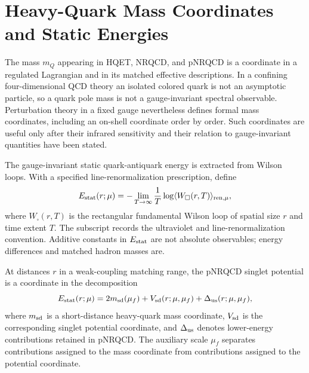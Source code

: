 \section{Heavy-Quark Mass Coordinates and Static Energies}
\label{sec:qcd-heavy-mass-static-energy}

The mass \(m_Q\) appearing in HQET, NRQCD, and pNRQCD is a coordinate in a
regulated Lagrangian and in its matched effective descriptions.  In a confining
four-dimensional QCD theory an isolated colored quark is not an asymptotic
particle, so a quark pole mass is not a gauge-invariant spectral observable.
Perturbation theory in a fixed gauge nevertheless defines formal mass
coordinates, including an on-shell coordinate order by order.  Such
coordinates are useful only after their infrared sensitivity and their
relation to gauge-invariant quantities have been stated.

The gauge-invariant static quark-antiquark energy is extracted from Wilson
loops.  With a specified line-renormalization prescription, define
\begin{equation}
  E_{\rm stat}(r;\mu)
  =
  -\lim_{T\to\infty}\frac1T
  \log \langle W_{\square}(r,T)\rangle_{\rm ren,\mu},
  \label{eq:qcd-static-energy-renormalized}
\end{equation}
where \(W_{\square}(r,T)\) is the rectangular fundamental Wilson loop of
spatial size \(r\) and time extent \(T\).  The subscript records the
ultraviolet and line-renormalization convention.  Additive constants in
\(E_{\rm stat}\) are not absolute observables; energy differences and matched
hadron masses are.

At distances \(r\) in a weak-coupling matching range, the pNRQCD singlet
potential is a coordinate in the decomposition
\begin{equation}
  E_{\rm stat}(r;\mu)
  =
  2m_{\rm sd}(\mu_f)+V_{\rm sd}(r;\mu,\mu_f)+\Delta_{\rm us}(r;\mu,\mu_f),
  \label{eq:qcd-static-energy-sd-decomposition}
\end{equation}
where \(m_{\rm sd}\) is a short-distance heavy-quark mass coordinate,
\(V_{\rm sd}\) is the corresponding singlet potential coordinate, and
\(\Delta_{\rm us}\) denotes lower-energy contributions retained in pNRQCD.
The auxiliary scale \(\mu_f\) separates contributions assigned to the mass
coordinate from contributions assigned to the potential coordinate.

